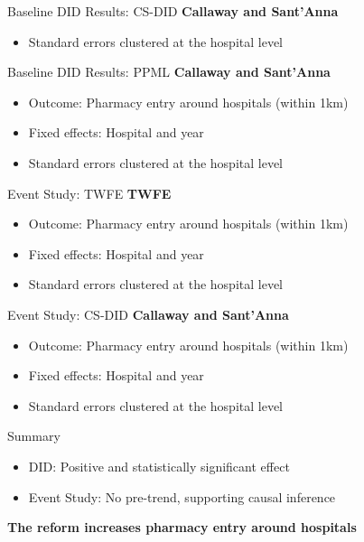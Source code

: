 \documentclass{beamer}
\begin{document}
\begin{frame}{Baseline DID Results: CS-DID}
\textbf{Callaway and Sant’Anna}
\begin{itemize}
    \item Standard errors clustered at the hospital level
\end{itemize}
\end{frame}

\begin{frame}{Baseline DID Results: PPML}
\textbf{Callaway and Sant’Anna}
\begin{itemize}
    \item Outcome: Pharmacy entry around hospitals (within 1km)
    \item Fixed effects: Hospital and year
    \item Standard errors clustered at the hospital level
\end{itemize}
\end{frame}

\begin{frame}{Event Study: TWFE}
\textbf{TWFE}
\begin{itemize}
    \item Outcome: Pharmacy entry around hospitals (within 1km)
    \item Fixed effects: Hospital and year
    \item Standard errors clustered at the hospital level
\end{itemize}
\end{frame}

\begin{frame}{Event Study: CS-DID}
\textbf{Callaway and Sant’Anna}
\begin{itemize}
    \item Outcome: Pharmacy entry around hospitals (within 1km)
    \item Fixed effects: Hospital and year
    \item Standard errors clustered at the hospital level
\end{itemize}
\end{frame}

\begin{frame}{Summary}

\begin{itemize}
    \item DID: Positive and statistically significant effect
    \item Event Study: No pre-trend, supporting causal inference
\end{itemize}

\vspace{0.6cm}

\centering
\textbf{The reform increases pharmacy entry around hospitals}

\end{frame}
\end{document}
